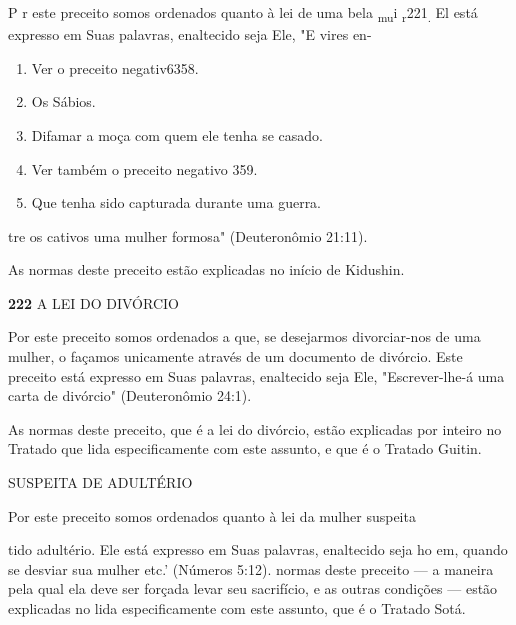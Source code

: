 \begin{itemize}
\begin{enumrate}
\begin{itemize}
\begin{itemize}
\begin{itemize}
P r este preceito somos ordenados quanto à lei de uma bela
\textsubscript{mu}i \textsubscript{r}221\textsubscript{.} El está
expresso em Suas palavras, enaltecido seja Ele, "E vires en-


\begin{enumerate}
\def\labelenumi{\arabic{enumi}.}
\setcounter{enumi}{216}
\item
 
 Ver o preceito negativ6358.
 
\item
 
 Os Sábios.
 
\item
 
 Difamar a moça com quem ele tenha se casado.
 
\item
 
 Ver também o preceito negativo 359.
 
\item
 
 Que tenha sido capturada durante uma guerra.
 
\end{enumerate}




tre os cativos uma mulher formosa" (Deuteronômio 21:11).


As normas deste preceito estão explicadas no início de Kidushin.


\textbf{222} A LEI DO DIVÓRCIO

Por este preceito somos ordenados a que, se desejarmos divorciar-nos de
uma mulher, o façamos unicamente através de um documento de divór­cio.
Este preceito está expresso em Suas palavras, enaltecido seja Ele,
"Escrever-lhe-á uma carta de divórcio" (Deuteronômio 24:1).

As normas deste preceito, que é a lei do divórcio, estão explicadas por
inteiro no Tratado que lida especificamente com este assunto, e que é o
Tratado Guitin.


SUSPEITA DE ADULTÉRIO

Por este preceito somos ordenados quanto à lei da mulher suspeita

tido adultério. Ele está expresso em Suas palavras, enaltecido seja ho
em, quando se desviar sua mulher etc.' (Números 5:12). normas deste
preceito --- a maneira pela qual ela deve ser forçada levar seu
sacrifício, e as outras condições --- estão explicadas no lida
especificamente com este assunto, que é o Tratado Sotá.



\end{itemize}
\end{itemize}
\end{itemize}
\end{enumrate}
\end{itemize}
